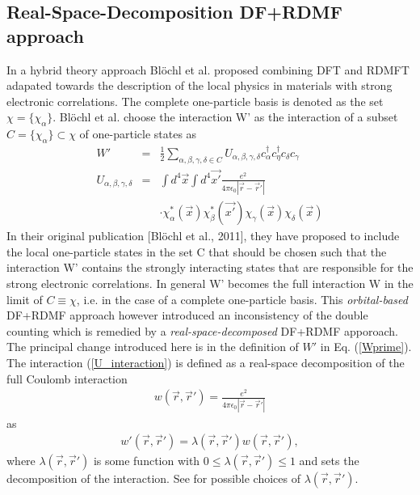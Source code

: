 \documentclass[%
 reprint,
nofootinbib,
 amsmath,amssymb,
 aps,
]{revtex4-2}
\begin{document}
\subsection{Real-Space-Decomposition DF+RDMF approach}
In a hybrid theory approach Blöchl et al. \cite{Bloechl2011} proposed combining DFT and RDMFT adapated towards the description of the local physics in materials with strong electronic correlations. The complete one-particle basis is denoted as the set $\chi = \{\chi_\alpha\}$. Blöchl et al. choose the interaction W' as the interaction of a subset $C=\{\chi_\alpha\}\subset \chi$ of one-particle states as
\begin{eqnarray}
W' &=& \frac{1}{2}\sum_{\alpha,\beta,\gamma,\delta\in C}U_{\alpha,\beta,\gamma,\delta}c^{\dagger}_\alpha c^{\dagger}_\eta c_\delta c_\gamma \label{Wprime} \\
U_{\alpha,\beta,\gamma,\delta} &=&\int d^4\Vec{x}\int d^4\Vec{x'}\frac{e^2}{4\pi\epsilon_0|\Vec{r}-\Vec{r}'|}\nonumber\\
&&\cdot\chi^*_\alpha(\Vec{x})\chi^*_\beta(\Vec{x'})\chi_\gamma(\Vec{x})\chi_\delta(\Vec{x}) \label{U_interaction}
\end{eqnarray}
In their original publication [Blöchl et al., 2011], they have proposed to include the local one-particle states in the set C that should be chosen such that the interaction W' contains the strongly interacting states that are responsible for the strong electronic correlations. In general W' becomes the full interaction W in the limit of $C\equiv\chi$, i.e. in the case of a complete one-particle basis. 
\break
\break
This \textit{orbital-based} DF+RDMF approach however introduced an inconsistency of the double counting\cite{schade2019new} which is remedied by a \textit{real-space-decomposed} DF+RDMF apporoach. The principal change introduced here is in the definition of $W'$ in Eq. (\ref{Wprime}). The interaction (\ref{U_interaction}) is defined as a real-space decomposition of the full Coulomb interaction 
\begin{eqnarray}
w(\Vec{r}, \Vec{r}') = \frac{e^2}{4\pi\epsilon_0|\Vec{r}-\Vec{r}'|}
\end{eqnarray}
as 
\begin{eqnarray}
w'(\Vec{r}, \Vec{r}') = \lambda(\Vec{r}, \Vec{r}')w(\Vec{r}, \Vec{r}'),
\end{eqnarray}
where $\lambda(\Vec{r}, \Vec{r}')$ is some function with $0\leq \lambda(\Vec{r}, \Vec{r}') \leq 1$ and sets the decomposition of the interaction. See \cite{schade2019new} for possible choices of $\lambda(\Vec{r}, \Vec{r}')$. 
\end{document}
